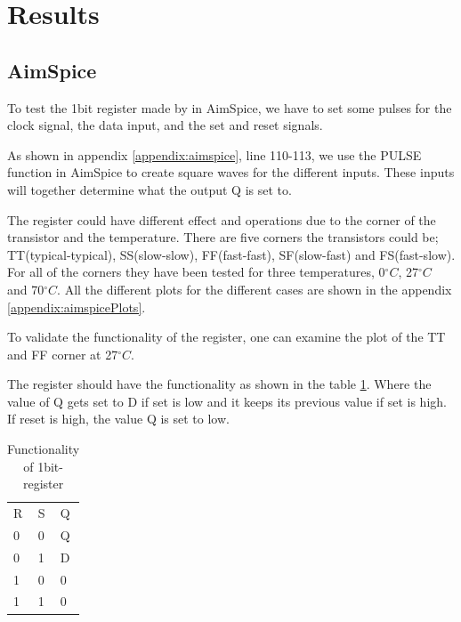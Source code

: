 \section{Results}
\label{sec:results}

\subsection{AimSpice}

To test the 1bit register made by in AimSpice, we have to set some pulses for the clock signal, the data input, and the set and reset signals. 

As shown in appendix \ref{appendix:aimspice}, line 110-113, we use the PULSE function in AimSpice to create square waves for the different inputs. These inputs will together determine what the output Q is set to. 

The register could have different effect and operations due to the corner of the transistor and the temperature. There are five corners the transistors could be; TT(typical-typical), SS(slow-slow), FF(fast-fast), SF(slow-fast) and FS(fast-slow). For all of the corners they have been tested for three temperatures, 0$^\circ C$, 27$^\circ C$ and 70$^\circ C$. All the different plots for the different cases are shown in the appendix \ref{appendix:aimspicePlots}. 

To validate the functionality of the register, one can examine the plot of the TT and FF corner at 27$^\circ C$. 

The register should have the functionality as shown in the table \ref{tab:registerFunc}. Where the value of Q gets set to D if set is low and it keeps its previous value if set is high. If reset is high, the value Q is set to low. 

\begin{table}[H]
\label{tab:registerFunc}
\centering
\caption{Functionality of 1bit-register}
\begin{tabular}{|l|l|l|}
\cline{1-3}
R & S & Q  \\ \cline{1-3}
0 & 0 & Q  \\ \cline{1-3}
0 & 1 & D  \\ \cline{1-3}
1 & 0 & 0  \\ \cline{1-3}
1 & 1 & 0  \\ \cline{1-3}
\end{tabular}
\end{table}

